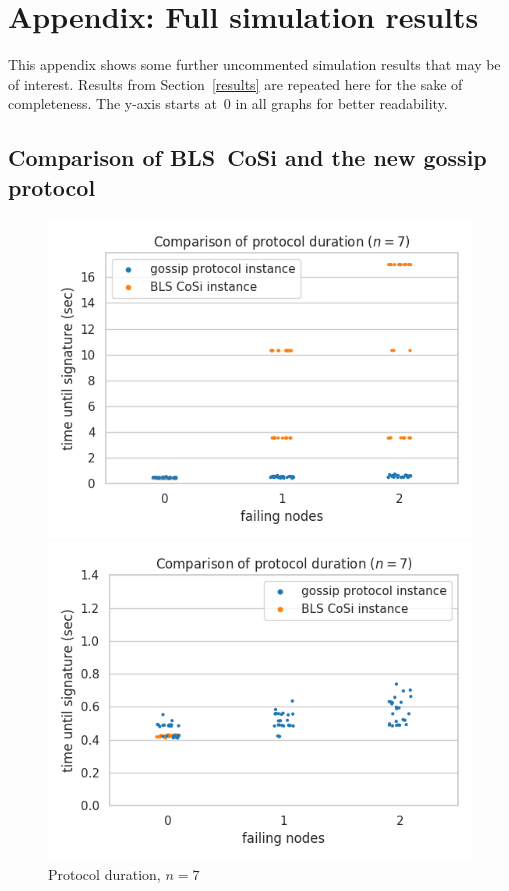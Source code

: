 \section{Appendix: Full simulation results}
\label{axresults}

This appendix shows some further uncommented simulation results that may be of interest.
Results from Section~\ref{results} are repeated here for the sake of completeness.
The y-axis starts at~0 in all graphs for better readability.


\subsection*{Comparison of BLS~CoSi and the new gossip protocol}

\begin{figure}[H]
    \centering
    \begin{minipage}{0.5\textwidth}
        \centering
        \includegraphics[width=\textwidth]{figures/1/round_wall_sum_7.png}
        \captionsetup{labelformat=empty}
        \caption{Protocol duration, $n = 7$}
    \end{minipage}\hfill
    \begin{minipage}{0.5\textwidth}
        \centering
        \includegraphics[width=\textwidth]{figures/1/round_wall_sum_zoomed_7.png}

\end{minipage}
\end{figure}
